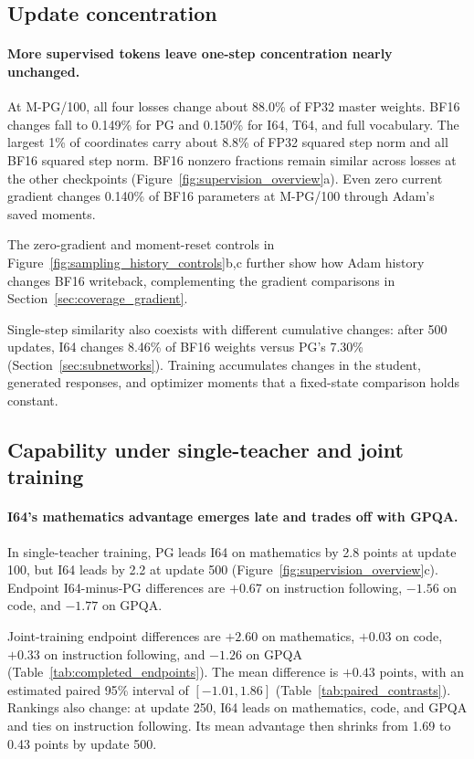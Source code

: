 \subsection{Update concentration}

\paragraph{More supervised tokens leave one-step concentration nearly unchanged.}
At M-PG/100, all four losses change about 88.0\% of FP32 master weights. BF16 changes fall to 0.149\% for PG and 0.150\% for I64, T64, and full vocabulary. The largest 1\% of coordinates carry about 8.8\% of FP32 squared step norm and all BF16 squared step norm. BF16 nonzero fractions remain similar across losses at the other checkpoints (Figure~\ref{fig:supervision_overview}a). Even zero current gradient changes 0.140\% of BF16 parameters at M-PG/100 through Adam's saved moments.

The zero-gradient and moment-reset controls in Figure~\ref{fig:sampling_history_controls}b,c further show how Adam history changes BF16 writeback, complementing the gradient comparisons in Section~\ref{sec:coverage_gradient}.



Single-step similarity also coexists with different cumulative changes: after 500 updates, I64 changes 8.46\% of BF16 weights versus PG's 7.30\% (Section~\ref{sec:subnetworks}). Training accumulates changes in the student, generated responses, and optimizer moments that a fixed-state comparison holds constant.

\subsection{Capability under single-teacher and joint training}

\paragraph{I64's mathematics advantage emerges late and trades off with GPQA.}
In single-teacher training, PG leads I64 on mathematics by 2.8 points at update 100, but I64 leads by 2.2 at update 500 (Figure~\ref{fig:supervision_overview}c). Endpoint I64-minus-PG differences are $+0.67$ on instruction following, $-1.56$ on code, and $-1.77$ on GPQA.

Joint-training endpoint differences are $+2.60$ on mathematics, $+0.03$ on code, $+0.33$ on instruction following, and $-1.26$ on GPQA (Table~\ref{tab:completed_endpoints}). The mean difference is $+0.43$ points, with an estimated paired 95\% interval of $[-1.01,1.86]$ (Table~\ref{tab:paired_contrasts}). Rankings also change: at update 250, I64 leads on mathematics, code, and GPQA and ties on instruction following. Its mean advantage then shrinks from 1.69 to 0.43 points by update 500.

